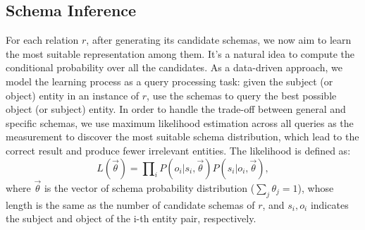 \subsection{Schema Inference}
\label{sec:schema}


For each relation $r$, after generating its candidate schemas, we now aim to learn the most suitable representation among them.
It's a natural idea to compute the conditional probability over all the candidates.
As a data-driven approach, we model the learning process as a query processing
task: given the subject (or object) entity in an instance of $r$,
use the schemas to query the best possible object (or subject) entity.
In order to handle the trade-off between general and specific schemas,
we use maximum likelihood estimation across
all queries as the measurement to discover the most suitable schema distribution,
which lead to the correct result and produce fewer irrelevant entities.
The likelihood is defined as:
\begin{equation}
\label{eqn:likelihood-def}
L(\vec{\theta}) = \prod\nolimits_{i} {P(o_i | s_i, \vec{\theta}) P(s_i | o_i, \vec{\theta})},
\end{equation}
\noindent
where $\vec{\theta}$ is the vector of schema probability distribution ($\sum\nolimits_{j} \theta_j = 1$),
whose length is the same as the number of candidate schemas of $r$,
and $s_i, o_i$ indicates the subject and object of the i-th entity pair, respectively.


